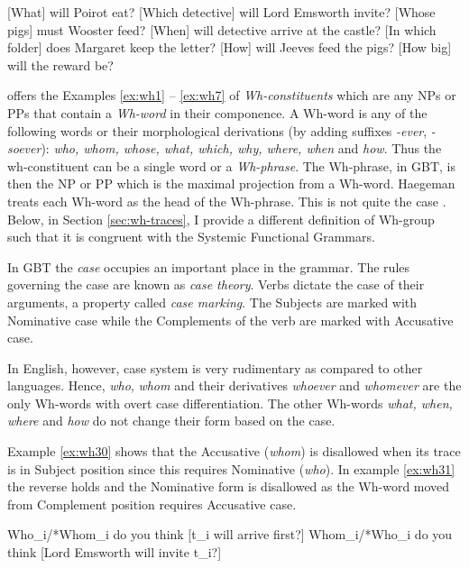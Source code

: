 \begin{exe}
	\ex\label{ex:wh1} [What] will Poirot eat?
	\ex\label{ex:wh2} [Which detective] will Lord Emsworth invite?
	\ex\label{ex:wh3} [Whose pigs] must Wooster feed?
	\ex\label{ex:wh4} [When] will detective arrive at the castle?
	\ex\label{ex:wh5} [In which folder] does Margaret keep the letter?
	\ex\label{ex:wh6} [How] will Jeeves feed the pigs? 
	\ex\label{ex:wh7} [How big] will the reward be?
\end{exe}

\citet[375]{Haegeman1991} offers the Examples \ref{ex:wh1} -- \ref{ex:wh7} of \textit{Wh-constituents} which are any NPs or PPs that contain a \textit{Wh-word} in their componence. A Wh-word is any of the following words or their morphological derivations (by adding suffixes \textit{-ever}, \textit{-soever}): \textit{who, whom, whose, what, which, why, where, when} and \textit{how}. Thus the wh-constituent can be a single word or a \textit{Wh-phrase}. The Wh-phrase, in GBT, is then the NP or PP which is the maximal projection from a Wh-word. Haegeman treats each Wh-word as the head of the Wh-phrase. This is not quite the case . Below, in Section \ref{sec:wh-traces}, I provide a different definition of Wh-group such that it is congruent with the Systemic Functional Grammars.

In GBT the \textit{case} occupies an important place in the grammar. The rules governing the case are known as \textit{case theory}. Verbs dictate the case of their arguments, a property called \textit{case marking}. The Subjects are marked with Nominative case while the Complements of the verb are marked with Accusative case. 

In English, however, case system is very rudimentary as compared to other languages. Hence, \textit{who}, \textit{whom} and their derivatives \textit{whoever} and \textit{whomever} are the only Wh-words with overt case differentiation. The other Wh-words \textit{what, when, where} and \textit{how} do not change their form based on the case. 

Example \ref{ex:wh30} shows that the Accusative (\textit{whom}) is disallowed when its trace is in Subject position since this requires Nominative (\textit{who}). In example \ref{ex:wh31} the reverse holds and the Nominative form is disallowed as the Wh-word moved from Complement position requires Accusative case. 

\begin{exe}
	\ex\label{ex:wh30} Who_{i}/*Whom_{i} do you think [t_{i} will arrive first?]
	\ex\label{ex:wh31} Whom_{i}/*Who_{i} do you think [Lord Emsworth will invite t_{i}?]
\end{exe}

